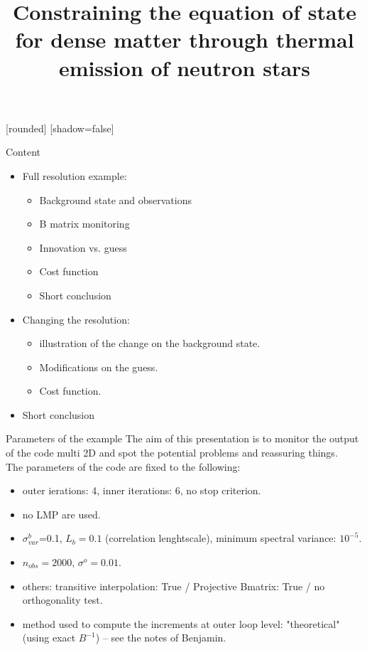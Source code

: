 \documentclass[francais]{beamer}
\title[Nicolas Baillot d'Etivaux]{Constraining the equation of state for dense matter through thermal emission of neutron stars}
\begin{document}
[rounded]%
[shadow=false]


\begin{frame}{Content}
\begin{itemize}
\item Full resolution example:
\begin{itemize}
\item Background state and observations
\item B matrix monitoring
\item Innovation vs. guess
\item Cost function
\item Short conclusion
\end{itemize}
\item Changing the resolution:
\begin{itemize}
\item illustration of the change on the background state.
\item Modifications on the guess.
\item Cost function.
\end{itemize}
\item Short conclusion
\end{itemize}
\end{frame}

\begin{frame}{Parameters of the example}
The aim of this presentation is to monitor the output of the code multi 2D and spot the potential problems and reassuring things.\\
The parameters of the code are fixed to the following:\\

\begin{itemize}
\item outer ierations: 4, inner iterations: 6, no stop criterion.
\item no LMP are used.
\item $\sigma^b_{var}$=0.1, $L_b=0.1$ (correlation lenghtscale), minimum spectral variance: $10^{-5}$.
\item $n_{obs}=2000$, $\sigma^o=0.01$.
\item others: transitive interpolation: True / Projective Bmatrix: True / no orthogonality test.
\item method used to compute the increments at outer loop level: "theoretical" (using exact $B^{-1}$) -- see the notes of Benjamin.
\end{itemize}
\end{frame}
\end{document}
